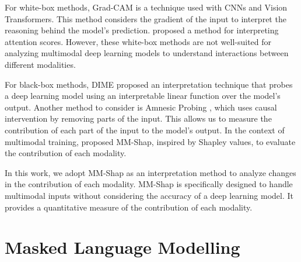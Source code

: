 For white-box methods, Grad-CAM  is a technique used with CNNs and Vision Transformers. 
This method considers the gradient of the input to interpret the reasoning behind the model’s prediction. 
 proposed a method for interpreting attention scores. 
However, these white-box methods are not well-suited for analyzing multimodal deep learning models to understand interactions between different modalities.

For black-box methods, DIME \cite{dime} proposed an interpretation technique that probes a deep learning model using an interpretable linear function over the model’s output. 
Another method to consider is Amnesic Probing \cite{amnesic-probing}, which uses causal intervention by removing parts of the input. 
This allows us to measure the contribution of each part of the input to the model's output. 
In the context of multimodal training,  proposed MM-Shap, inspired by Shapley values, to evaluate the contribution of each modality.

In this work, we adopt MM-Shap as an interpretation method to analyze changes in the contribution of each modality.
MM-Shap is specifically designed to handle multimodal inputs without considering the accuracy of a deep learning model. 
It provides a quantitative measure of the contribution of each modality.

\section{Masked Language Modelling}
